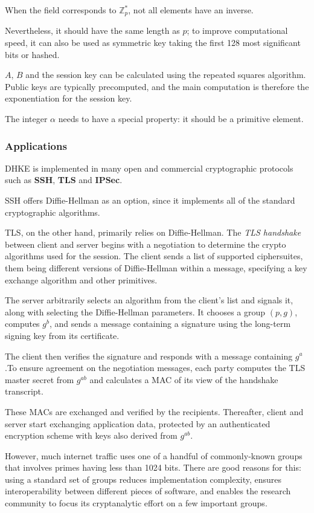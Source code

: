 When the field corresponds to $\mathbb{Z}^*_p$, not all elements have an inverse. 

Nevertheless, it should have the same length as $p$; to improve computational speed, it can also be used as symmetric key taking the first 128 most significant bits or hashed. 

$A$, $B$ and the session key can be calculated using the repeated squares algorithm. Public keys are typically precomputed, and the main computation is therefore the exponentiation for the session key.

The integer $\alpha$ needs to have a special property: it should be a primitive element.

\subsubsection{Applications}
DHKE is implemented in many open and commercial cryptographic protocols such as \textbf{SSH}, \textbf{TLS} and \textbf{IPSec}. 

SSH offers Diffie-Hellman as an option, since it implements all of the standard cryptographic algorithms.

TLS, on the other hand, primarily relies on Diffie-Hellman. The \textit{TLS handshake} between client and server begins with a negotiation to determine the crypto algorithms used for the session. The client sends a list of supported ciphersuites, them being different versions of Diffie-Hellman within a message, specifying a key exchange algorithm and other primitives. 

The server arbitrarily selects an algorithm from the client’s list and signals it, along with selecting the Diffie-Hellman parameters. It chooses a group $(p, g)$, computes $g^b$, and sends a message containing a signature using the long-term signing key from its certificate. 

The client then verifies the signature and responds with a message containing $g^a$.To ensure agreement on the negotiation messages, each party computes the TLS master secret from $g^{ab}$ and calculates a MAC of its view of the handshake transcript. 

These MACs are exchanged and verified by the recipients. Thereafter, client and server start exchanging application data, protected by an authenticated encryption scheme with keys also derived from $g^{ab}$.

However, much internet traffic uses one of a handful of commonly-known groups that involves primes having less than 1024 bits. There are good reasons for this: using a standard set of groups reduces implementation complexity, ensures interoperability between different pieces of software, and enables the research community to focus its cryptanalytic effort on a few important groups.

